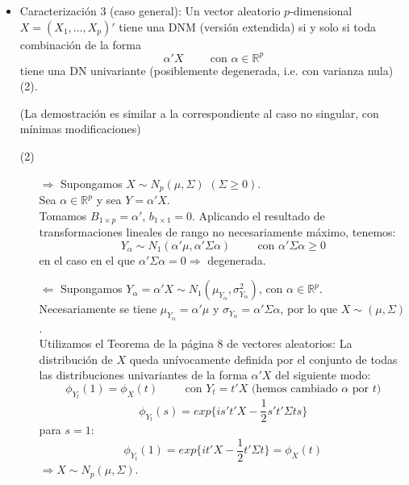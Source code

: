 \documentclass[11pt,a4paper]{article}
\begin{document}
\begin{itemize}
\item Caracterización 3 (caso general): Un vector aleatorio $p$-dimensional $X = (X_{1}, \dots, X_{p})'$ tiene una DNM (versión extendida) si y solo si toda combinación de la forma
$$\alpha'X \hspace{1cm} \text{con } \alpha \in \mathbb{R}^{p}$$
tiene una DN univariante (posiblemente degenerada, i.e. con varianza nula) (2).

(La demostración es similar a la correspondiente al caso no singular, con mínimas modificaciones)

\item[(2)] \begin{itemize}
\item[$\Rightarrow$] Supongamos $X \sim N_{p}(\mu, \Sigma)$ $(\Sigma \geq 0)$. \\
Sea $\alpha \in \mathbb{R}^{p}$ y sea $Y = \alpha'X$. \\
Tomamos $B_{1 \times p} = \alpha'$, $b_{1 \times 1} = 0$. Aplicando el resultado de transformaciones lineales de rango no necesariamente máximo, tenemos:
$$Y_{\alpha} \sim N_{1}(\alpha'\mu, \alpha'\Sigma\alpha) \hspace{1cm} \text{con } \alpha'\Sigma\alpha \geq 0$$
en el caso en el que $\alpha'\Sigma\alpha = 0 \Rightarrow$ degenerada.

\item[$\Leftarrow$] Supongamos $Y_{\alpha} = \alpha'X \sim N_{1}(\mu_{Y_{\alpha}}, \sigma_{Y_{\alpha}}^{2})$, con $\alpha \in \mathbb{R}^{p}$. \\
Necesariamente se tiene $\mu_{Y_{\alpha}} = \alpha'\mu$ y $\sigma_{Y_{\alpha}} = \alpha'\Sigma\alpha$, por lo que $X \sim (\mu, \Sigma)$. \\
Utilizamos el Teorema de la página 8 de vectores aleatorios: La distribución de $X$ queda unívocamente definida por el conjunto de todas las distribuciones univariantes de la forma $\alpha'X$ del siguiente modo:
$$\phi_{Y_{t}}(1) = \phi_{X}(t) \hspace{1cm} \text{con } Y_{t} = t'X \text{ (hemos cambiado } \alpha \text{ por } t)$$
$$\phi_{Y_{t}}(s) = exp\{is't'X-\frac{1}{2}s't'\Sigma ts\}$$
para $s=1$:
$$\phi_{Y_{t}}(1) = exp\{it'X - \frac{1}{2}t'\Sigma t\} = \phi_{X}(t)$$
$\Rightarrow X \sim N_{p}(\mu, \Sigma)$.
\end{itemize}
\end{itemize}
\end{document}
